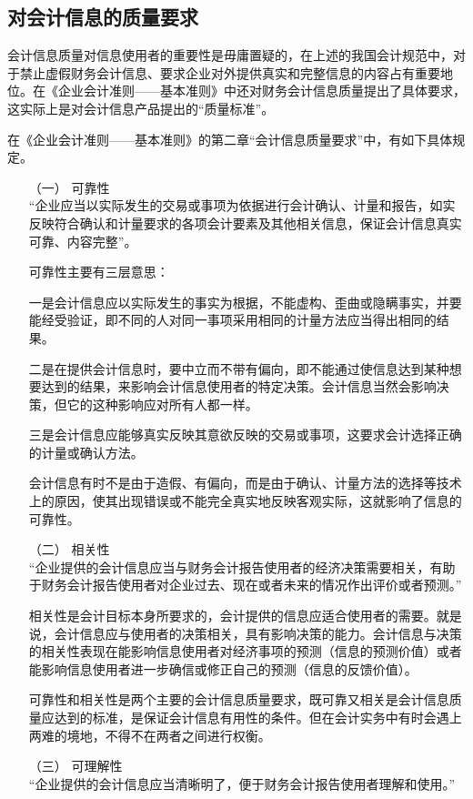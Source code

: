 				\subsection{对会计信息的质量要求}
				会计信息质量对信息使用者的重要性是毋庸置疑的，在上述的我国会计规范中，对于禁止虚假财务会计信息、要求企业对外提供真实和完整信息的内容占有重要地位。在《企业会计准则——基本准则》中还对财务会计信息质量提出了具体要求，这实际上是对会计信息产品提出的“质量标准”。
					
				在《企业会计准则——基本准则》的第二章“会计信息质量要求”中，有如下具体规定。
				\begin{enumerate}
					\item[（一）] 可靠性 \\
						“企业应当以实际发生的交易或事项为依据进行会计确认、计量和报告，如实反映符合确认和计量要求的各项会计要素及其他相关信息，保证会计信息真实可靠、内容完整”。
						
						可靠性主要有三层意思：
						
						一是会计信息应以实际发生的事实为根据，不能虚构、歪曲或隐瞒事实，并要能经受验证，即不同的人对同一事项采用相同的计量方法应当得出相同的结果。
						
						二是在提供会计信息时，要中立而不带有偏向，即不能通过使信息达到某种想要达到的结果，来影响会计信息使用者的特定决策。会计信息当然会影响决策，但它的这种影响应对所有人都一样。
						
						三是会计信息应能够真实反映其意欲反映的交易或事项，这要求会计选择正确的计量或确认方法。
						
						会计信息有时不是由于造假、有偏向，而是由于确认、计量方法的选择等技术上的原因，使其出现错误或不能完全真实地反映客观实际，这就影响了信息的可靠性。
					\item[（二）] 相关性 \\
						“企业提供的会计信息应当与财务会计报告使用者的经济决策需要相关，有助于财务会计报告使用者对企业过去、现在或者未来的情况作出评价或者预测。”
						
						相关性是会计目标本身所要求的，会计提供的信息应适合使用者的需要。就是说，会计信息应与使用者的决策相关，具有影响决策的能力。会计信息与决策的相关性表现在能影响信息使用者对经济事项的预测（信息的预测价值）或者能影响信息使用者进一步确信或修正自己的预测（信息的反馈价值）。

						可靠性和相关性是两个主要的会计信息质量要求，既可靠又相关是会计信息质量应达到的标准，是保证会计信息有用性的条件。但在会计实务中有时会遇上两难的境地，不得不在两者之间进行权衡。

					\item[（三）] 可理解性 \\
						“企业提供的会计信息应当清晰明了，便于财务会计报告使用者理解和使用。”
						

\end{enumerate}
